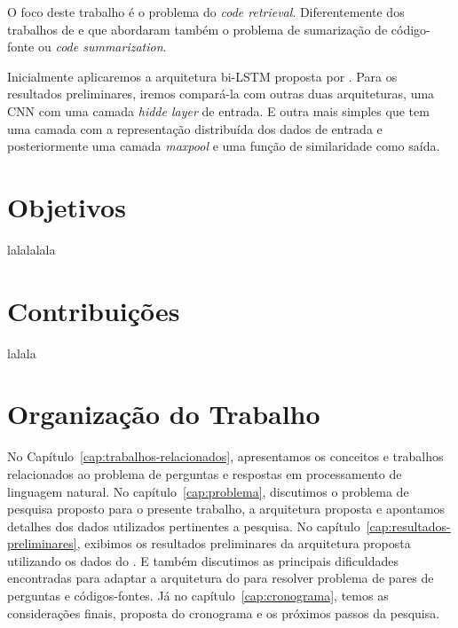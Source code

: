 O foco deste trabalho é o problema do \textit{code retrieval}. Diferentemente dos trabalhos de \cite{iyer-etal-2016-summarizing} e \cite{Allamanis-bimodal-source-code-natural-language:2015} que abordaram também o problema de sumarização de código-fonte ou \textit{code summarization}. 

Inicialmente aplicaremos a arquitetura bi-LSTM proposta por \cite{tan-lstm-qa}. Para os resultados preliminares, iremos compará-la com outras duas arquiteturas, uma CNN com uma camada \textit{hidde layer} de entrada. E outra mais simples que tem uma camada com a representação distribuída dos dados de entrada e posteriormente uma camada \textit{maxpool} e uma função de similaridade como saída.




\section{Objetivos}
\label{sec:objetivo}

lalalalala

\section{Contribuições}
\label{sec:contribucoes}

lalala

\section{Organização do Trabalho}
\label{sec:organizacao_trabalho}

No Capítulo~\ref{cap:trabalhos-relacionados}, apresentamos os conceitos e trabalhos relacionados ao problema de perguntas e respostas em processamento de linguagem natural. No capítulo~\ref{cap:problema}, discutimos o problema de pesquisa proposto para o presente trabalho, a arquitetura proposta e apontamos detalhes dos dados utilizados pertinentes a pesquisa. 
No capítulo~\ref{cap:resultados-preliminares}, exibimos os resultados preliminares da arquitetura proposta utilizando os dados do \cite{yao-2018}. E também discutimos as principais dificuldades encontradas para adaptar a arquitetura do \cite{feng-2015} para resolver problema de pares de perguntas e códigos-fontes. Já no capítulo~\ref{cap:cronograma}, temos as considerações finais, proposta do cronograma e os próximos passos da pesquisa.